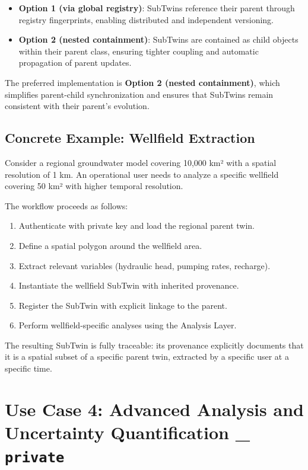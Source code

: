 \begin{itemize}
\item \textbf{Option 1 (via global registry)}: SubTwins reference their parent through registry fingerprints, enabling distributed and independent versioning.

\item \textbf{Option 2 (nested containment)}: SubTwins are contained as child objects within their parent class, ensuring tighter coupling and automatic propagation of parent updates.
\end{itemize}

The preferred implementation is \textbf{Option 2 (nested containment)}, which simplifies parent-child synchronization and ensures that SubTwins remain consistent with their parent's evolution.

\subsection{Concrete Example: Wellfield Extraction}

Consider a regional groundwater model covering 10,000 km² with a spatial resolution of 1 km. An operational user needs to analyze a specific wellfield covering 50 km² with higher temporal resolution.

The workflow proceeds as follows:

\begin{enumerate}
\item Authenticate with private key and load the regional parent twin.
\item Define a spatial polygon around the wellfield area.
\item Extract relevant variables (hydraulic head, pumping rates, recharge).
\item Instantiate the wellfield SubTwin with inherited provenance.
\item Register the SubTwin with explicit linkage to the parent.
\item Perform wellfield-specific analyses using the Analysis Layer.
\end{enumerate}

The resulting SubTwin is fully traceable: its provenance explicitly documents that it is a spatial subset of a specific parent twin, extracted by a specific user at a specific time.


\section{Use Case 4: Advanced Analysis and Uncertainty Quantification _ \texttt{private}}

